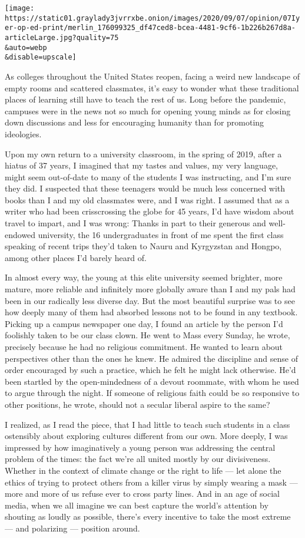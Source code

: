 \texttt{[image: https://static01.graylady3jvrrxbe.onion/images/2020/09/07/opinion/07Iyer-op-ed-print/merlin\_176099325\_df47ced8-bcea-4481-9cf6-1b226b267d8a-articleLarge.jpg?quality=75\\\&auto=webp\\\&disable=upscale]}

As colleges throughout the United States reopen, facing a weird new
landscape of empty rooms and scattered classmates, it's easy to wonder
what these traditional places of learning still have to teach the rest
of us. Long before the pandemic, campuses were in the news not so much
for opening young minds as for closing down discussions and less for
encouraging humanity than for promoting ideologies.

Upon my own return to a university classroom, in the spring of 2019,
after a hiatus of 37 years, I imagined that my tastes and values, my
very language, might seem out-of-date to many of the students I was
instructing, and I'm sure they did. I suspected that these teenagers
would be much less concerned with books than I and my old classmates
were, and I was right. I assumed that as a writer who had been
crisscrossing the globe for 45 years, I'd have wisdom about travel to
impart, and I was wrong: Thanks in part to their generous and
well-endowed university, the 16 undergraduates in front of me spent the
first class speaking of recent trips they'd taken to Nauru and
Kyrgyzstan and Hongpo, among other places I'd barely heard of.

In almost every way, the young at this elite university seemed brighter,
more mature, more reliable and infinitely more globally aware than I and
my pals had been in our radically less diverse day. But the most
beautiful surprise was to see how deeply many of them had absorbed
lessons not to be found in any textbook. Picking up a campus newspaper
one day, I found an article by the person I'd foolishly taken to be our
class clown. He went to Mass every Sunday, he wrote, precisely because
he had no religious commitment. He wanted to learn about perspectives
other than the ones he knew. He admired the discipline and sense of
order encouraged by such a practice, which he felt he might lack
otherwise. He'd been startled by the open-mindedness of a devout
roommate, with whom he used to argue through the night. If someone of
religious faith could be so responsive to other positions, he wrote,
should not a secular liberal aspire to the same?

I realized, as I read the piece, that I had little to teach such
students in a class ostensibly about exploring cultures different from
our own. More deeply, I was impressed by how imaginatively a young
person was addressing the central problem of the times: the fact we're
all united mostly by our divisiveness. Whether in the context of climate
change or the right to life --- let alone the ethics of trying to
protect others from a killer virus by simply wearing a mask --- more and
more of us refuse ever to cross party lines. And in an age of social
media, when we all imagine we can best capture the world's attention by
shouting as loudly as possible, there's every incentive to take the most
extreme --- and polarizing --- position around.

